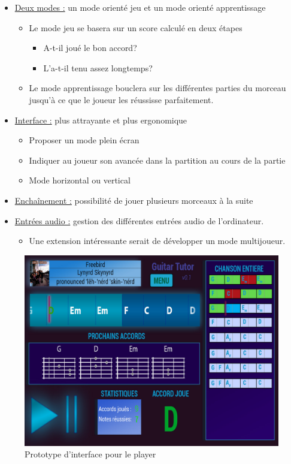 \documentclass[a4paper,11pt]{article}
\begin{document}
\begin{itemize}
 \item \underline{Deux modes :} un mode orienté jeu et un mode orienté apprentissage
 \begin{itemize}
  \item Le mode jeu se basera sur un score calculé en deux étapes
  \begin{itemize}
   \item A-t-il joué le bon accord?
   \item L'a-t-il tenu assez longtemps?
  \end{itemize}
  \item Le mode apprentissage bouclera sur les différentes parties du morceau jusqu'à ce que le joueur les réussisse parfaitement.
 \end{itemize}
 \item \underline{Interface :} plus attrayante et plus ergonomique
 \begin{itemize}
  \item Proposer un mode plein écran
  \item Indiquer au joueur son avancée dans la partition au cours de la partie
  \item Mode horizontal ou vertical
 \end{itemize}
 \item \underline{Enchaînement :} possibilité de jouer plusieurs morceaux à la suite
 \item \underline{Entrées audio :} gestion des différentes entrées audio de l'ordinateur.
 \begin{itemize}
  \item Une extension intéressante serait de développer un mode multijoueur.
 \end{itemize}
\end{itemize}


\begin{figure}[!ht]
\begin{center}
\includegraphics[width=450px]{interface_player_prototype.jpg}
\caption{Prototype d'interface pour le player}
\label{annexe_proto_player}
\end{center}
\end{figure}
\end{document}
